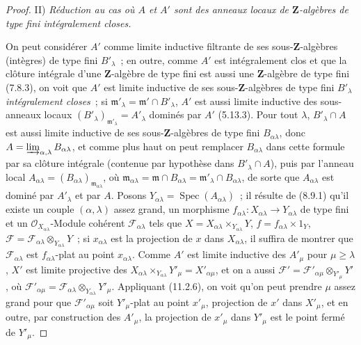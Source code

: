 \begin{proof}
\medskip
\noindent II) \emph{Réduction au cas où $A$ et $A'$ sont des anneaux
locaux de $\mathbf Z$-algèbres de type fini intégralement closes.}

On peut considérer $A'$ comme limite inductive filtrante de ses
sous-$\mathbf Z$-algèbres (intègres) de type fini $B'_{\lambda}$~; en outre,
comme $A'$ est intégralement clos et que la clôture intégrale d'une
$\mathbf Z$-algèbre de type fini est aussi une $\mathbf Z$-algèbre de type fini
(7.8.3), on voit que $A'$ est limite inductive de ses sous-$\mathbf Z$-algèbres
de type fini $B'_{\lambda}$ \emph{intégralement closes}~; si
$\mathfrak m'_{\lambda}=\mathfrak m'\cap B'_{\lambda}$, $A'$ est aussi limite
inductive des sous-anneaux locaux
$(B'_{\lambda})_{\mathfrak m'_{\lambda}}=A'_{\lambda}$ dominés par $A'$
(5.13.3). Pour tout $\lambda$, $B'_{\lambda}\cap A$ est aussi limite inductive
de ses sous-$\mathbf Z$-algèbres de type fini $B_{\alpha\lambda}$, donc
$A=\varinjlim_{\alpha,\lambda}B_{\alpha\lambda}$, et comme plus haut on peut
remplacer $B_{\alpha\lambda}$ dans cette formule par sa clôture intégrale
(contenue par hypothèse dans $B'_{\lambda}\cap A$), puis par l'anneau local
$A_{\alpha\lambda}=(B_{\alpha\lambda})_{\mathfrak m_{\alpha\lambda}}$, où
$\mathfrak m_{\alpha\lambda}=\mathfrak m\cap B_{\alpha\lambda}
=\mathfrak m'_{\lambda}\cap B_{\alpha\lambda}$, de sorte que
$A_{\alpha\lambda}$ est dominé par $A'_{\lambda}$ et par $A$. Posons
$Y_{\alpha\lambda}=\operatorname{Spec}(A_{\alpha\lambda})$~; il résulte de
(8.9.1) qu'il existe un couple $(\alpha,\lambda)$ assez grand, un morphisme
$f_{\alpha\lambda}:X_{\alpha\lambda}\to Y_{\alpha\lambda}$ de type fini et un
$\mathcal O_{X_{\alpha\lambda}}$-Module cohérent $\mathcal F_{\alpha\lambda}$
tels que
$X=X_{\alpha\lambda}\times_{Y_{\alpha\lambda}}Y$,
$f=f_{\alpha\lambda}\times1_Y$,
$\mathcal F=\mathcal F_{\alpha\lambda}\otimes_{Y_{\alpha\lambda}}Y$~;
si $x_{\alpha\lambda}$ est la projection de $x$ dans $X_{\alpha\lambda}$, il
suffira de montrer que $\mathcal F_{\alpha\lambda}$ est
$f_{\alpha\lambda}$-plat au point $x_{\alpha\lambda}$. Comme $A'$ est limite
inductive des $A'_{\mu}$ pour $\mu\geq\lambda$, $X'$ est limite projective des
$X_{\alpha\lambda}\times_{Y_{\alpha\lambda}}Y'_{\mu}=X'_{\alpha\mu}$, et on a aussi
$\mathcal F'=\mathcal F'_{\alpha\mu}\otimes_{Y'_{\mu}}Y'$, où
$\mathcal F'_{\alpha\mu}
=\mathcal F_{\alpha\lambda}\otimes_{Y_{\alpha\lambda}}Y'_{\mu}$.
Appliquant (11.2.6), on voit qu'on peut prendre $\mu$ assez grand pour que
$\mathcal F'_{\alpha\mu}$ soit $Y'_{\mu}$-plat au point $x'_{\mu}$, projection
de $x'$ dans $X'_{\mu}$, et en outre, par construction des $A'_{\mu}$, la
projection de $x'_{\mu}$ dans $Y'_{\mu}$ est le point fermé de $Y'_{\mu}$.


\end{proof}

